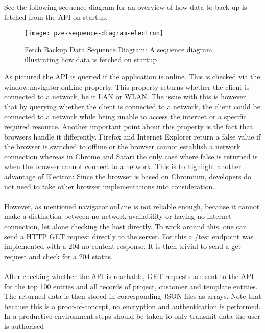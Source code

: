See the following sequence diagram for an overview of how data to back up is fetched from the API 
on startup.
\begin{figure}[H]
  \centering
  \label{fig:pze-sequence-diagram-electron}
  \texttt{[image: pze-sequence-diagram-electron]}
  \caption{Fetch Backup Data Sequence Diagram:
  A sequence diagram illustrating how data is fetched on startup}
\end{figure}
As pictured the API is queried if the application is online.
This is checked via the window.navigator.onLine property.
This property returns whether the client is connected to a network, be it LAN or WLAN.
The issue with this is however, that by querying whether the client is connected to a network,
the client could be connected to a network while being unable to access the internet or a specific
required resource.
Another important point about this property is the fact that browsers handle it differently.
Firefox and Internet Explorer return a false value if the browser is switched to offline or the browser
cannot establish a network connection whereas in Chrome and Safari the only case where false is returned
is when the browser cannot connect to a network. \parencite{onLineMdn}
This is to highlight another advantage of Electron: Since the browser is based on Chromium, 
developers do not need to take other browser implementations into consideration.\paragraph{}
However, as mentioned navigator.onLine is not reliable enough, because it cannot make a distinction
between no network availability or having no internet connection, let alone checking the 
host directly.
To work around this, one can send a HTTP GET request directly to the server. 
For this a /test endpoint was implemented with a 204 no content response. 
It is then trivial to send a get request and check for a 204 status.\paragraph{}
After checking whether the API is reachable, GET requests are sent to the API for the top 100 entries
and all records of project, customer and template entities. 
The returned data is then stored in corresponding JSON files as arrays. 
Note that because this is a proof-of-concept, no encryption and authentication is performed.
In a productive environment steps should be taken to only transmit data the user is authorised 
